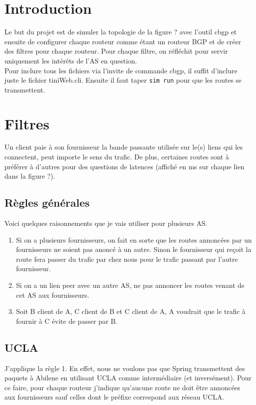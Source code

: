 \documentclass[a4paper, 12pt]{article}
\begin{document}


\section{Introduction}
Le but du projet est de simuler la topologie de la figure ? avec l'outil cbgp et ensuite de configurer chaque routeur comme étant un routeur BGP et de créer des filtres pour chaque routeur.
Pour chaque filtre, on réfléchit pour servir uniquement les intérêts de l'AS en question.
\\

Pour inclure tous les fichiers via l'invite de commande cbgp, il suffit d'inclure juste le fichier tiniWeb.cli.
Ensuite il faut taper \texttt{sim run} pour que les routes se transmettent.
\section{Filtres}
Un client paie à son fournisseur la bande passante utilisée sur le(s) liens qui les connectent, peut importe le sens du trafic.
De plus, certaines routes sont à préférer à d'autres pour des questions de latences (affiché en ms sur chaque lien dans la figure ?).
\subsection{Règles générales}
Voici quelques raisonnements que je vais utiliser pour plusieurs AS.
\begin{enumerate}
 \item Si on a plusieurs fournisseurs, on fait en sorte que les routes annoncées par un fournisseurs ne soient pas anoncé à un autre.
 Sinon le fournisseur qui reçoit la route fera passer du trafic par chez nous pour le trafic passant par l'autre fournisseur.
 \item Si on a un lien peer avec un autre AS, ne pas annoncer les routes venant de cet AS aux fournisseurs.
 \item Soit B client de A, C client de B et C client de A, A voudrait que le trafic à fournir à C évite de passer par B.
\end{enumerate}

\subsection{UCLA}
J'applique la règle 1.
En effet, nous ne voulons pas que Spring transmettent des paquets à Abilene en utilisant UCLA comme intermédiaire (et inversément).
Pour ce faire, pour chaque routeur j'indique qu'aucune route ne doit être annoncées aux fournisseurs sauf celles dont le préfixe correspond aux réseau UCLA.
\end{document}
